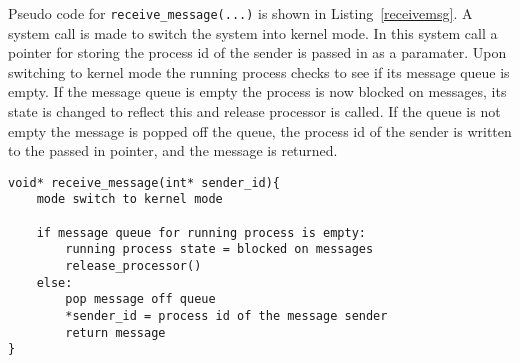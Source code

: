 \documentclass[oneside]{article}
\begin{document}
Pseudo code for \texttt{receive\_message(...)} is shown in Listing~\ref{receivemsg}. A system call is made 
to switch the system into kernel mode. In this system call a pointer for storing the process id of the sender 
is passed in as a paramater. Upon switching to kernel mode the running process checks to see if its message 
queue is empty. If the message queue is empty the process is now blocked on messages, its state is changed 
to reflect this and release processor is called. If the queue is not empty the message is popped off the 
queue, the process id of the sender is written to the passed in pointer, and the message is returned. 


\begin{lstlisting}
void* receive_message(int* sender_id){
    mode switch to kernel mode

    if message queue for running process is empty:
        running process state = blocked on messages
        release_processor()
    else:
        pop message off queue
        *sender_id = process id of the message sender
        return message      
}
\end{lstlisting}
\end{document}
